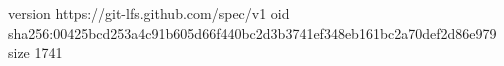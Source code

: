 version https://git-lfs.github.com/spec/v1
oid sha256:00425bcd253a4c91b605d66f440bc2d3b3741ef348eb161bc2a70def2d86e979
size 1741
